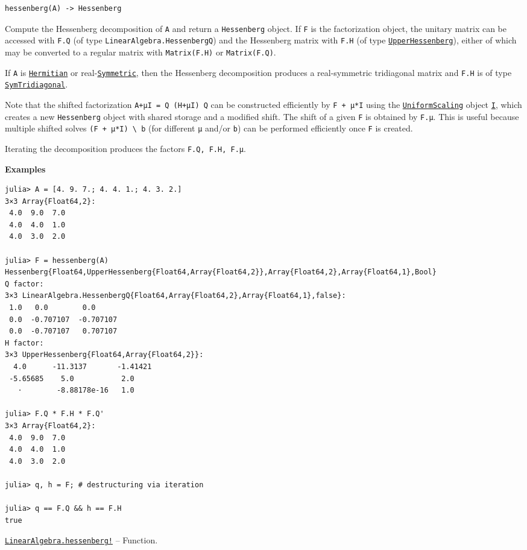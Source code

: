 \begin{adjustwidth}{2em}{0pt}


\begin{verbatim}
hessenberg(A) -> Hessenberg
\end{verbatim}

Compute the Hessenberg decomposition of \texttt{A} and return a \texttt{Hessenberg} object. If \texttt{F} is the factorization object, the unitary matrix can be accessed with \texttt{F.Q} (of type \texttt{LinearAlgebra.HessenbergQ}) and the Hessenberg matrix with \texttt{F.H} (of type \hyperlink{6167777885202579792}{\texttt{UpperHessenberg}}), either of which may be converted to a regular matrix with \texttt{Matrix(F.H)} or \texttt{Matrix(F.Q)}.

If \texttt{A} is \hyperlink{938713992181310063}{\texttt{Hermitian}} or real-\hyperlink{17683454167504168761}{\texttt{Symmetric}}, then the Hessenberg decomposition produces a real-symmetric tridiagonal matrix and \texttt{F.H} is of type \hyperlink{6062797780727203318}{\texttt{SymTridiagonal}}.

Note that the shifted factorization \texttt{A+μI = Q (H+μI) Q{\textquotesingle}} can be constructed efficiently by \texttt{F + μ*I} using the \hyperlink{723087258311673942}{\texttt{UniformScaling}} object \hyperlink{15346645596018210602}{\texttt{I}}, which creates a new \texttt{Hessenberg} object with shared storage and a modified shift.   The shift of a given \texttt{F} is obtained by \texttt{F.μ}. This is useful because multiple shifted solves \texttt{(F + μ*I) {\textbackslash} b} (for different \texttt{μ} and/or \texttt{b}) can be performed efficiently once \texttt{F} is created.

Iterating the decomposition produces the factors \texttt{F.Q, F.H, F.μ}.

\textbf{Examples}


\begin{verbatim}
julia> A = [4. 9. 7.; 4. 4. 1.; 4. 3. 2.]
3×3 Array{Float64,2}:
 4.0  9.0  7.0
 4.0  4.0  1.0
 4.0  3.0  2.0

julia> F = hessenberg(A)
Hessenberg{Float64,UpperHessenberg{Float64,Array{Float64,2}},Array{Float64,2},Array{Float64,1},Bool}
Q factor:
3×3 LinearAlgebra.HessenbergQ{Float64,Array{Float64,2},Array{Float64,1},false}:
 1.0   0.0        0.0
 0.0  -0.707107  -0.707107
 0.0  -0.707107   0.707107
H factor:
3×3 UpperHessenberg{Float64,Array{Float64,2}}:
  4.0      -11.3137       -1.41421
 -5.65685    5.0           2.0
   ⋅        -8.88178e-16   1.0

julia> F.Q * F.H * F.Q'
3×3 Array{Float64,2}:
 4.0  9.0  7.0
 4.0  4.0  1.0
 4.0  3.0  2.0

julia> q, h = F; # destructuring via iteration

julia> q == F.Q && h == F.H
true
\end{verbatim}



\end{adjustwidth}
\hypertarget{6911141030439555603}{} 
\hyperlink{6911141030439555603}{\texttt{LinearAlgebra.hessenberg!}}  -- {Function.}

